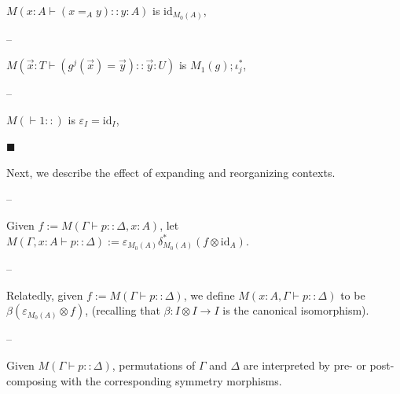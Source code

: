 \documentclass[10pt,a4paper]{amsart}
\begin{document}
$M\left(x:A\vdash(x=_{A}y)::y:A\right)$ is $\mathrm{id}_{M_{0}(A)}$,\par
 
 
 
\par\noindent  – 
 
$M\left(\vec{x}:T\vdash(g^{j}(\vec{x})=\vec{y})::\vec{y}:U\right)$ is $M_{1}(g);\iota^{*}_{j}$,\par
 
 
 
\par\noindent  – 
 
$M\left(\vdash 1::\right)$ is $\varepsilon_{I}=\mathrm{id}_{I}$,\par
 
 
  
 
 
\par\noindent  $\blacksquare$ 
 
Next, we describe the effect of expanding and reorganizing contexts.\par
  
\par\noindent  – 
 
Given $f:=M(\Gamma\vdash p::\Delta,x:A)$, let $M(\Gamma,x:A\vdash p::\Delta):=\varepsilon_{M_{0}(A)}\delta^{*}_{M_{0}(A)}(f%
\otimes\mathrm{id}_{A})$.\par
 
 
 
\par\noindent  – 
 
Relatedly, given $f:=M(\Gamma\vdash p::\Delta)$, we define $M(x:A,\Gamma\vdash p::\Delta)$ to be $\beta(\varepsilon_{M_{0}(A)}\otimes f)$, (recalling that $\beta:I\otimes I\to I$ is the canonical isomorphism).\par
 
 
 
\par\noindent  – 
 
Given $M(\Gamma\vdash p::\Delta)$, permutations of $\Gamma$ and $\Delta$ are interpreted by pre- or post-composing with the corresponding symmetry morphisms.\par
 
 
\end{document}
